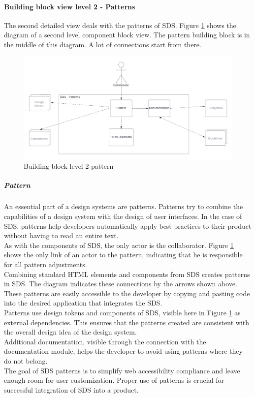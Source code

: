 \paragraph{Building block view level 2 - Patterns}
The second detailed view deals with the patterns of SDS. Figure \ref{building_block_level_2_pattern_sds} shows the diagram of a second level component block view. The pattern building block is in the middle of this diagram. A lot of connections start from there.
\begin{figure}[htbp]
    \centerline{
    \includegraphics[width=\linewidth]{images/building_block_view_level_2_pattern.png}}
\caption{Building block level 2 pattern}
\label{building_block_level_2_pattern_sds}
\end{figure}



\subparagraph{Pattern}
An essential part of a design systems are patterns. Patterns try to combine the capabilities of a design system with the design of user interfaces. In the case of \ac{SDS}, patterns help developers automatically apply best practices to their product without having to read an entire text. \\
As with the components of SDS, the only actor is the collaborator. Figure \ref{building_block_level_2_pattern_sds} shows the only link of an actor to the pattern, indicating that he is responsible for all pattern adjustments. \\
Combining standard HTML elements and components from SDS creates patterns in SDS. The diagram indicates these connections by the arrows shown above. These patterns are easily accessible to the developer by copying and pasting code into the desired application that integrates the \ac{SDS}. \\
Patterns use design tokens and components of \ac{SDS}, visible here in Figure \ref{building_block_level_2_pattern_sds} as external dependencies. This ensures that the patterns created are consistent with the overall design idea of the design system. \\
Additional documentation, visible through the connection with the documentation module, helps the developer to avoid using patterns where they do not belong. \\
The goal of \ac{SDS} patterns is to simplify web accessibility compliance and leave enough room for user customization. Proper use of patterns is crucial for successful integration of \ac{SDS} into a product.


